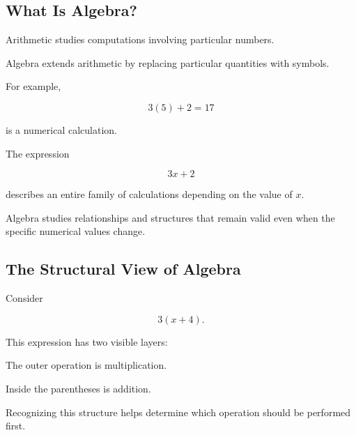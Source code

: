 \subsection{What Is Algebra?}
\label{subsec:what-is-algebra}

Arithmetic studies computations involving particular numbers.

Algebra extends arithmetic by replacing particular quantities with symbols.

For example,

\[ 3(5)+2=17 \]

is a numerical calculation.

The expression

\[ 3x+2 \]

describes an entire family of calculations depending on the value of \(x\).

\begin{conceptbox}
Algebra studies relationships and structures that remain valid even when the
specific numerical values change.
\end{conceptbox}

\subsection{The Structural View of Algebra}
\label{subsec:structural-view-algebra}

Consider

\[ 3(x+4). \]

This expression has two visible layers:

\begin{center}
\end{center}

The outer operation is multiplication.

Inside the parentheses is addition.

Recognizing this structure helps determine which operation should be performed
first.

